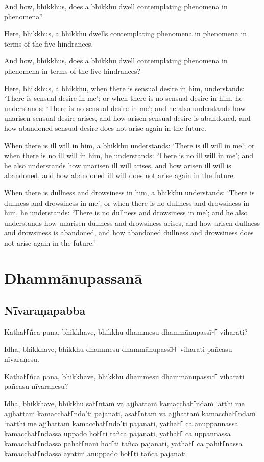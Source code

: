 And how, bhikkhus, does a bhikkhu dwell contemplating phenomena in phenomena?

Here, bhikkhus, a bhikkhu dwells contemplating phenomena in phenomena in terms
of the five hindrances.

And how, bhikkhus, does a bhikkhu dwell contemplating phenomena in phenomena in
terms of the five hindrances?

Here, bhikkhus, a bhikkhu,
when there is sensual desire in him, understands:
`There is sensual desire in me';
or when there is no sensual desire in him, he understands:
`There is no sensual desire in me';
and he also understands how unarisen sensual desire arises,
and how arisen sensual desire is abandoned,
and how abandoned sensual desire does not arise again in the future.

When there is ill will in him, a bhikkhu understands:
`There is ill will in me';
or when there is no ill will in him, he understands:
`There is no ill will in me';
and he also understands how unarisen ill will arises,
and how arisen ill will is abandoned,
and how abandoned ill will does not arise again in the future.

When there is dullness and drowsiness in him, a bhikkhu understands:
`There is dullness and drowsiness in me';
or when there is no dullness and drowsiness in him, he understands:
`There is no dullness and drowsiness in me';
and he also understands how unarisen dullness and drowsiness arises,
and how arisen dullness and drowsiness is abandoned, and
how abandoned dullness and drowsiness does not arise again in the future.'

\paliPage
\chapter*{Dhammānupassanā}

\section*{Nīvaraṇapabba}

Katha꜔꜒ñca pana, bhikkhave, bhikkhu dhammesu dhammānupassī꜔꜒ viharati?

Idha, bhikkhave, bhikkhu dhammesu dhammānupassī꜔꜒ viharati pañcasu nīvaraṇesu.

Katha꜔꜒ñca pana, bhikkhave, bhikkhu dhammesu dhammānupassī꜔꜒ viharati pañcasu
nīvaraṇesu?

Idha, bhikkhave, bhikkhu
sa꜔꜒ntaṁ vā ajjhattaṁ kāmaccha꜔꜒ndaṁ ‘atthi me ajjhattaṁ kāmaccha꜔꜒ndo’ti pajānāti,
asa꜔꜒ntaṁ vā ajjhattaṁ kāmaccha꜔꜒ndaṁ ‘natthi me ajjhattaṁ kāmaccha꜔꜒ndo’ti pajānāti,
yathā꜔꜒ ca anuppannassa kāmaccha꜔꜒ndassa uppādo ho꜔꜒ti tañca pajānāti,
yathā꜔꜒ ca uppannassa kāmaccha꜔꜒ndassa pahā꜔꜒naṁ ho꜔꜒ti tañca pajānāti,
yathā꜔꜒ ca pahī꜔꜒nassa kāmaccha꜔꜒ndassa āyatiṁ anuppādo ho꜔꜒ti tañca pajānāti.


